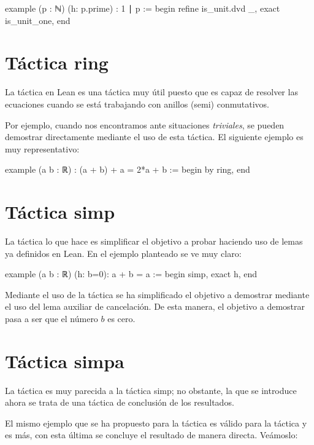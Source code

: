 \begin{leancode}
example (p : ℕ) (h: p.prime) : 1 ∣ p :=
begin
  refine is_unit.dvd _,
  exact is_unit_one,
end
\end{leancode}

\section{Táctica ring}

La táctica  en Lean es una táctica muy útil puesto que es
capaz de resolver las ecuaciones cuando se está trabajando con anillos
(semi) conmutativos.

Por ejemplo, cuando nos encontramos ante situaciones \textit{triviales}, se
pueden demostrar directamente mediante el uso de esta táctica. El siguiente
ejemplo es muy representativo:

\begin{leancode}
example (a b : ℝ) : (a + b) + a = 2*a + b :=
begin
  by ring,
end
\end{leancode}

\section{Táctica simp}

La táctica  lo que hace es simplificar el objetivo a probar
haciendo uso de lemas ya definidos en Lean. En el ejemplo planteado se ve muy
claro:
\begin{leancode}
example (a b : ℝ) (h: b=0): a + b = a :=
begin
  simp,
  exact h,
end
\end{leancode}

Mediante el uso de la táctica  se ha simplificado el
objetivo a demostrar mediante el uso del lema auxiliar de cancelación. De esta
manera, el objetivo a demostrar pasa a ser que el número \(b\) es cero.

\section{Táctica simpa}

La táctica  es muy parecida a la táctica 
{simp}; no obstante, la que se introduce ahora se trata de una táctica de
conclusión de los resultados.

El mismo ejemplo que se ha propuesto para la táctica  es
válido para la táctica  y es más, con esta última se
concluye el resultado de manera directa. Veámoslo:

